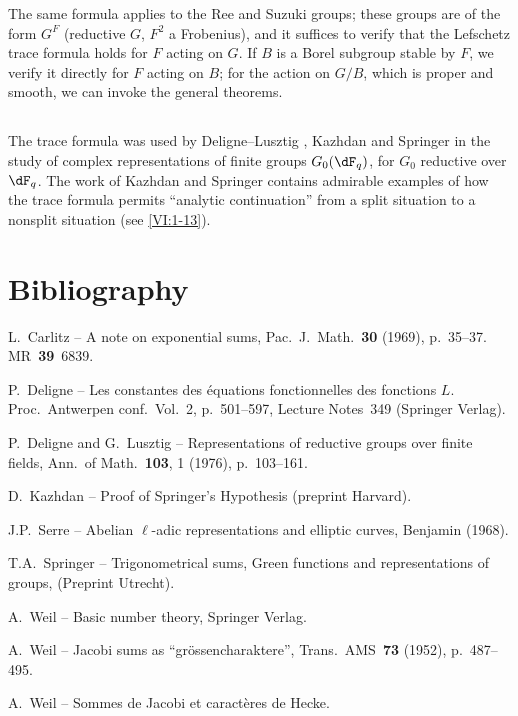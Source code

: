 The same formula applies to the Ree and Suzuki groups; these groups are 
of the form $G^F$ (reductive $G$, $F^2$ a Frobenius), and it suffices to 
verify that the Lefschetz trace formula holds for $F$ acting 
on $G$. If $B$ is a Borel subgroup stable by $F$, we verify it 
directly for $F$ acting on $B$; for the action on $G/B$, which is proper and 
smooth, we can invoke the general theorems. 





\subsection{}\label{VI:8-3}

The trace formula was used by Deligne--Lusztig \cite{dl76}, 
Kazhdan \cite{ka77} and Springer \cite{sp76} in the study of 
complex representations of finite groups $G_0(\dF_q)$, for $G_0$ 
reductive over $\dF_q$. The work of Kazhdan and Springer contains 
admirable examples of how the trace formula permits ``analytic 
continuation'' from a split situation to a nonsplit situation 
(see \ref{VI:1-13}).

\section*{Bibliography}
\begin{enumerate}[{[}1{]}]
\item L.~Carlitz -- A note on exponential sums, Pac.~J.~Math.~\textbf{30} (1969), p.~35--37. MR~\textbf{39}~6839.
\item P.~Deligne -- Les constantes des équations fonctionnelles des fonctions $L$.
Proc.~Antwerpen conf.~Vol.~2, p.~501--597, Lecture Notes~349 (Springer Verlag).
\item P.~Deligne and G.~Lusztig -- Representations of reductive groups over finite fields,
Ann.~of Math.~\textbf{103}, 1 (1976), p.~103--161.
\item D.~Kazhdan -- Proof of Springer's Hypothesis (preprint Harvard).
\item J.P.~Serre -- Abelian $\ell$-adic representations and elliptic curves, Benjamin (1968).
\item T.A.~Springer -- Trigonometrical sums, Green functions and representations of
 groups, (Preprint Utrecht).
\item A.~Weil -- Basic number theory, Springer Verlag.
\item A.~Weil -- Jacobi sums as ``gr\"ossencharaktere'', Trans.~AMS~\textbf{73} (1952), p.~487--495.
\item A.~Weil -- Sommes de Jacobi et caractères de Hecke.
\end{enumerate}
